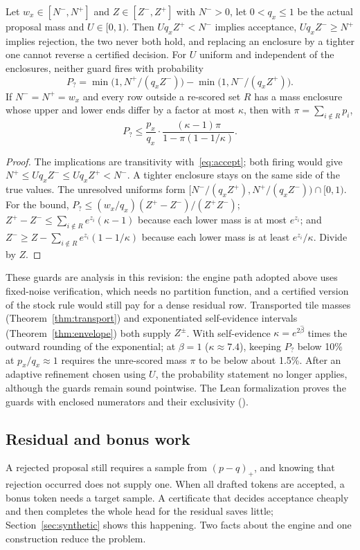 \begin{theorem}\label{thm:guards}\label{thm:guard}
Let $w_x\in[N^-,N^+]$ and $Z\in[Z^-,Z^+]$ with $N^->0$, let $0<q_x\le1$ be the actual proposal mass and $U\in[0,1)$. Then $Uq_xZ^+<N^-$ implies acceptance, $Uq_xZ^-\ge N^+$ implies rejection, the two never both hold, and replacing an enclosure by a tighter one cannot reverse a certified decision. For $U$ uniform and independent of the enclosures, neither guard fires with probability
\[P_?=\min\bigl(1,N^+/(q_xZ^-)\bigr)-\min\bigl(1,N^-/(q_xZ^+)\bigr).\]
If $N^-=N^+=w_x$ and every row outside a re-scored set $R$ has a mass enclosure whose upper and lower ends differ by a factor at most $\kappa$, then with $\pi=\sum_{i\notin R}p_i$,
\[P_?\le\frac{p_x}{q_x}\cdot\frac{(\kappa-1)\pi}{1-\pi(1-1/\kappa)}.\]
\end{theorem}
\begin{proof}
The implications are transitivity with~\eqref{eq:accept}; both firing would give $N^+\le Uq_xZ^-\le Uq_xZ^+<N^-$. A tighter enclosure stays on the same side of the true values. The unresolved uniforms form $[N^-/(q_xZ^+),N^+/(q_xZ^-))\cap[0,1)$. For the bound, $P_?\le(w_x/q_x)(Z^+-Z^-)/(Z^+Z^-)$; $Z^+-Z^-\le\sum_{i\notin R}e^{z_i}(\kappa-1)$ because each lower mass is at most $e^{z_i}$; and $Z^-\ge Z-\sum_{i\notin R}e^{z_i}(1-1/\kappa)$ because each lower mass is at least $e^{z_i}/\kappa$. Divide by $Z$.
\end{proof}
These guards are analysis in this revision: the engine path adopted above uses fixed-noise verification, which needs no partition function, and a certified version of the stock rule would still pay for a dense residual row. Transported tile masses (Theorem~\ref{thm:transport}) and exponentiated self-evidence intervals (Theorem~\ref{thm:envelope}) both supply $Z^\pm$. With self-evidence $\kappa=e^{2\hat\beta}$ times the outward rounding of the exponential; at $\beta=1$ ($\kappa\approx7.4$), keeping $P_?$ below 10\% at $p_x/q_x\approx1$ requires the unre-scored mass $\pi$ to be below about 1.5\%. After an adaptive refinement chosen using $U$, the probability statement no longer applies, although the guards remain sound pointwise. The Lean formalization proves the guards with enclosed numerators and their exclusivity ().

\subsection{Residual and bonus work}\label{sec:residual}
A rejected proposal still requires a sample from $(p-q)_+$, and knowing that rejection occurred does not supply one. When all drafted tokens are accepted, a bonus token needs a target sample. A certificate that decides acceptance cheaply and then completes the whole head for the residual saves little; Section~\ref{sec:synthetic} shows this happening. Two facts about the engine and one construction reduce the problem.

